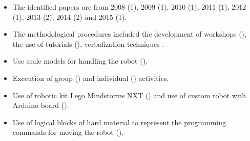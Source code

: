 \begin{itemize}
    
\item The identified papers are from 2008 (1), 2009 (1), 2010 (1), 2011 (1), 2012 (1), 2013 (2), 2014 (2) and 2015 (1).

\item The methodological procedures included the development of workshops (\cite{ludi2011,howard2012,ludi2014,Howard:2013,Kakehashi:2015, Ludi:2008}), the use of tutorials (\cite{Ludi:2008,ludi2011,howard2012,Howard:2013}), verbalization techniques \cite{howard2012}.

\item Use scale models for handling the robot (\cite{Ludi:2008,Howard:2013,Kakehashi:2015}).

\item Execution of group (\cite{ludi2011, ludi2014,Ludi:2008,Howard:2013}) and individual (\cite{howard2012, Kakehashi:2015}) activities.

\item Use of robotic kit Lego Mindstorms NXT (\cite{Ludi:2008,ludi2010,ludi2011,howard2012, Howard:2013, ludi2014}) and use of custom robot with Arduino board (\cite{Kakehashi2013,Kakehashi:2015,Motoyoshi:2015}).

\item Use of logical blocks of hard material to represent the programming commands for moving the robot  (\cite{Kakehashi:2015,Kakehashi2013,Motoyoshi:2015}).


\end{itemize}
